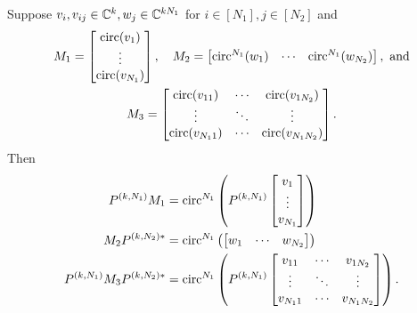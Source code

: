 \begin{lemma}
  Suppose $v_i, v_{ij} \in \mathbb{C}^k, w_j \in \mathbb{C}^{k N_1}$ for $i \in [N_1], j \in [N_2]$ and
  \begin{gather*}
    M_1 = \begin{bmatrix} \operatorname{circ}(v_1) \\ \vdots \\ \operatorname{circ}(v_{N_1}) \end{bmatrix},\quad
    M_2 = \begin{bmatrix} \operatorname{circ}^{N_1}(w_1) & \cdots & \operatorname{circ}^{N_1}(w_{N_2}) \end{bmatrix},\ \text{and} \\
    M_3 = \begin{bmatrix} \operatorname{circ}(v_{11}) & \cdots & \operatorname{circ}(v_{1 N_2}) \\ \vdots & \ddots & \vdots \\ \operatorname{circ}(v_{N_1 1}) & \cdots & \operatorname{circ}(v_{N_1 N_2}) \end{bmatrix}.\end{gather*}
  Then
  \begin{align}
    P^{(k, N_1)} M_1 &= \operatorname{circ}^{N_1}\left(P^{(k, N_1)} \begin{bmatrix} v_1 \\ \vdots \\ v_{N_1} \end{bmatrix}\right) \label{eq:M_1} \\
    M_2 P^{(k, N_2)*} &= \operatorname{circ}^{N_1}\left(\begin{bmatrix} w_1 & \cdots & w_{N_2} \end{bmatrix}\right) \label{eq:M_2} \\
    P^{(k, N_1)}M_3P^{(k, N_2)*} &= \operatorname{circ}^{N_1}\left(P^{(k, N_1)} \begin{bmatrix} v_{11} & \cdots & v_{1 N_2} \\ \vdots & \ddots & \vdots \\ v_{N_1 1} & \cdots & v_{N_1 N_2} \end{bmatrix}\right). \label{eq:M_3}
  \end{align}
  \label{lem:interleave}
\end{lemma}

